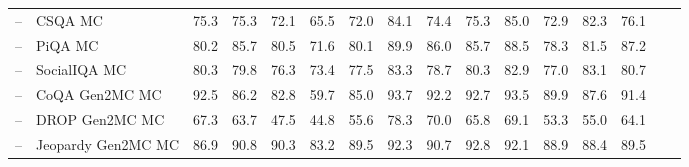 \documentclass[table]{ai2style/ai2}
\begin{document}
\begin{table}[t]
{{\begin{NiceTabular}{@{}Hl
P{35pt}C{35pt}C{35pt}C{35pt}C{35pt}|C{35pt}C{35pt}C{35pt}C{35pt}C{35pt}C{35pt}C{35pt}C{35pt}C{35pt}@{}}
 -- & CSQA MC                                                                                                & 75.3                   & 75.3              & 72.1                & 65.5                & 72.0                 & 84.1              & 74.4                   & 75.3                & 85.0                 & 72.9                  & 82.3                    & 76.1             \\
 -- & PiQA MC                                                                                                & 80.2                   & 85.7              & 80.5                & 71.6                & 80.1                 & 89.9              & 86.0                   & 85.7                & 88.5                 & 78.3                  & 81.5                    & 87.2             \\
 -- & SocialIQA MC                                                                                           & 80.3                   & 79.8              & 76.3                & 73.4                & 77.5                 & 83.3              & 78.7                   & 80.3                & 82.9                 & 77.0                  & 83.1                    & 80.7             \\
 -- & CoQA Gen2MC MC                                                                                         & 92.5                   & 86.2              & 82.8                & 59.7                & 85.0                 & 93.7              & 92.2                   & 92.7                & 93.5                 & 89.9                  & 87.6                    & 91.4             \\
 -- & DROP Gen2MC MC                                                                                         & 67.3                   & 63.7              & 47.5                & 44.8                & 55.6                 & 78.3              & 70.0                   & 65.8                & 69.1                 & 53.3                  & 55.0                    & 64.1             \\
 -- & Jeopardy Gen2MC MC                                                                                     & 86.9                   & 90.8              & 90.3                & 83.2                & 89.5                 & 92.3              & 90.7                   & 92.8                & 92.1                 & 88.9                  & 88.4                    & 89.5             \\

\end{NiceTabular}}}
\end{table}
\end{document}
